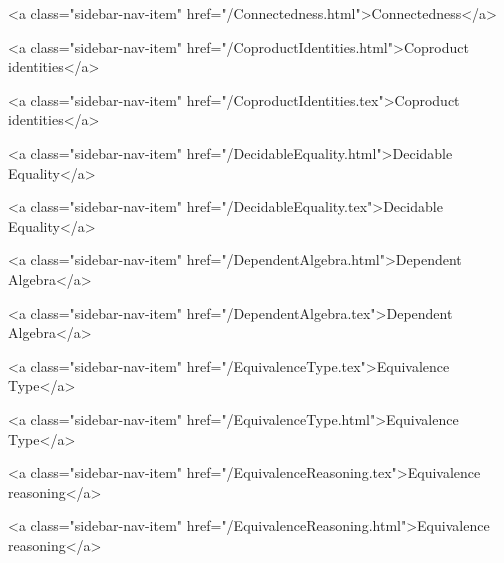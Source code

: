      
    
      
        
          <a class="sidebar-nav-item" href="/Connectedness.html">Connectedness</a>
        
      
    
      
        
          <a class="sidebar-nav-item" href="/CoproductIdentities.html">Coproduct identities</a>
        
      
    
      
        
          <a class="sidebar-nav-item" href="/CoproductIdentities.tex">Coproduct identities</a>
        
      
    
      
        
          <a class="sidebar-nav-item" href="/DecidableEquality.html">Decidable Equality</a>
        
      
    
      
        
          <a class="sidebar-nav-item" href="/DecidableEquality.tex">Decidable Equality</a>
        
      
    
      
        
          <a class="sidebar-nav-item" href="/DependentAlgebra.html">Dependent Algebra</a>
        
      
    
      
        
          <a class="sidebar-nav-item" href="/DependentAlgebra.tex">Dependent Algebra</a>
        
      
    
      
        
          <a class="sidebar-nav-item" href="/EquivalenceType.tex">Equivalence Type</a>
        
      
    
      
        
          <a class="sidebar-nav-item" href="/EquivalenceType.html">Equivalence Type</a>
        
      
    
      
        
          <a class="sidebar-nav-item" href="/EquivalenceReasoning.tex">Equivalence reasoning</a>
        
      
    
      
        
          <a class="sidebar-nav-item" href="/EquivalenceReasoning.html">Equivalence reasoning</a>
        
